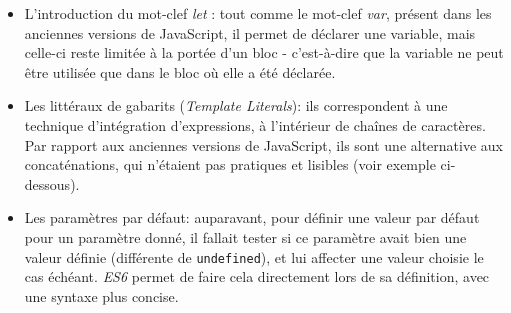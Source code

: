 \begin{itemize}
\item
  L'introduction du mot-clef \emph{let} : tout comme le mot-clef
  \emph{var}, présent dans les anciennes versions de JavaScript, il
  permet de déclarer une variable, mais celle-ci reste limitée à la
  portée d'un bloc - c'est-à-dire que la variable ne peut être utilisée
  que dans le bloc où elle a été déclarée.
\item
  Les littéraux de gabarits (\emph{Template Literals}): ils
  correspondent à une technique d'intégration d'expressions, à
  l'intérieur de chaînes de caractères. Par rapport aux anciennes
  versions de JavaScript, ils sont une alternative aux concaténations,
  qui n'étaient pas pratiques et lisibles (voir exemple ci-dessous).

\begin{Shaded}
\begin{Highlighting}[]
 \OperatorTok{=} 
 \OperatorTok{=} \SpecialCharTok{$\{}\SpecialCharTok{\}}
 \OperatorTok{=} \OperatorTok{;}
 \OperatorTok{=}  \OperatorTok{+} \OperatorTok{;}
\end{Highlighting}
\end{Shaded}
\item
  Les paramètres par défaut: auparavant, pour définir une valeur par
  défaut pour un paramètre donné, il fallait tester si ce paramètre
  avait bien une valeur définie (différente de \texttt{undefined}), et
  lui affecter une valeur choisie le cas échéant. \emph{ES6} permet de
  faire cela directement lors de sa définition, avec une syntaxe plus
  concise.


\end{itemize}
